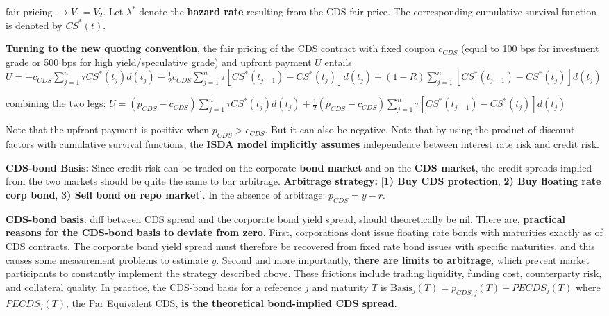 \documentclass[landscape]{article}
\begin{document}
\begin{multicols}{4}
fair pricing $\rightarrow V_1 = V_2$. Let $\lambda^*$ denote the \textbf{hazard rate} resulting from the CDS fair price. The corresponding cumulative survival function is denoted by $CS^*(t)$.

\textbf{Turning to the new quoting convention}, the fair pricing of the CDS contract with fixed coupon $c_{CDS}$ (equal to 100 bps for investment grade or 500 bps for high yield/speculative grade) and upfront payment $U$ entails $U = -c_{CDS} \sum_{j=1}^{n} \tau CS^*(t_j)d(t_j) - \frac{1}{2} c_{CDS} \sum_{j=1}^{n} \tau [CS^*(t_{j-1}) - CS^*(t_j)]d(t_j) + (1 - R) \sum_{j=1}^{n} [CS^*(t_{j-1}) - CS^*(t_j)]d(t_j)$

combining the two legs: $U = (p_{CDS} - c_{CDS}) \sum_{j=1}^{n} \tau CS^*(t_j)d(t_j) + \frac{1}{2}(p_{CDS} - c_{CDS}) \sum_{j=1}^{n} \tau [CS^*(t_{j-1}) - CS^*(t_j)]d(t_j)$

Note that the upfront payment is positive when $p_{CDS} > c_{CDS}$. But it can also be negative.
Note that by using the product of discount factors with cumulative survival functions, the \textbf{ISDA model implicitly assumes} independence between interest rate risk and credit risk.

\textcolor{subsubsectioncolor}{\textbf{CDS-bond Basis:}} Since credit risk can be traded on the corporate \textbf{bond market} and on the \textbf{CDS market}, the credit spreads implied from the two markets should be quite the same to bar arbitrage. \textbf{Arbitrage strategy:} [\textcolor{keycolor}{\textbf{1) Buy CDS protection}}, \textcolor{keycolor}{\textbf{2) Buy floating rate corp bond}}, \textcolor{keycolor}{\textbf{3) Sell bond on repo market}}]. In the absence of arbitrage: $p_{CDS} = y - r$.

\textbf{CDS-bond basis}: diff between CDS spread and the corporate bond yield spread, should theoretically be nil.
There are, \textbf{practical reasons for the CDS-bond basis to} \textbf{deviate from zero}. First, corporations dont issue floating rate bonds with maturities exactly as of CDS contracts. The corporate bond yield spread must therefore be recovered from fixed rate bond issues with specific maturities, and this causes some measurement problems to estimate $y$. Second and more importantly, \textbf{there are limits to arbitrage}, which prevent market participants to constantly implement the strategy described above. These frictions include trading liquidity, funding cost, counterparty risk, and collateral quality.
In practice, the CDS-bond basis for a reference $j$ and maturity $T$ is $\text{Basis}_j(T) = p_{CDS,j}(T) - PECDS_j(T)$
where $PECDS_j(T)$, the Par Equivalent CDS, \textbf{is the theoretical bond-implied CDS spread}.


\end{multicols}
\end{document}
